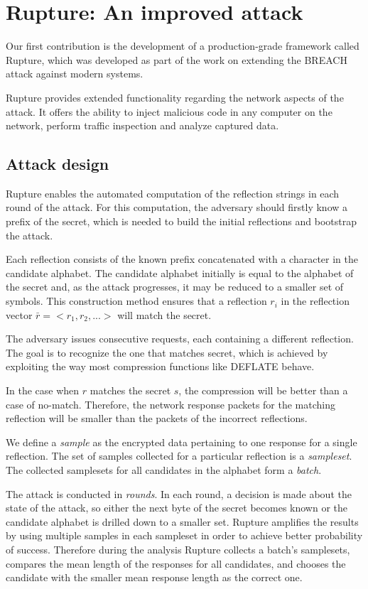 \section{Rupture: An improved attack}\label{subsec:rupture}
Our first contribution is the development of a production-grade framework called
Rupture, which was developed as part of the work on extending the BREACH attack
against modern systems.

Rupture provides extended functionality regarding the network aspects of the
attack. It offers the ability to inject malicious code in any computer on the
network, perform traffic inspection and analyze captured data.

\subsection{Attack design}\label{subsec:rupture_attack_design}

Rupture enables the automated computation of the reflection strings in each
round of the attack. For this computation, the adversary should firstly know a
prefix of the secret, which is needed to build the initial reflections and
bootstrap the attack.

Each reflection consists of the known prefix concatenated with a character in
the candidate alphabet. The candidate alphabet initially is equal to the
alphabet of the secret and, as the attack progresses, it may be reduced to a
smaller set of symbols. This construction method ensures that a reflection $r_i$
in the reflection vector $\bar{r} = <r_1, r_2, ...>$ will match the secret.

The adversary issues consecutive requests, each containing a different
reflection. The goal is to recognize the one that matches secret, which is
achieved by exploiting the way most compression functions like DEFLATE behave.

In the case when $r$ matches the secret $s$, the compression will be better than
a case of no-match. Therefore, the network response packets for the matching
reflection will be smaller than the packets of the incorrect reflections.

We define a \textit{sample} as the encrypted data pertaining to one response for
a single reflection. The set of samples collected for a particular reflection is a
\textit{sampleset}. The collected samplesets for all candidates in the alphabet
form a \textit{batch}.

The attack is conducted in \textit{rounds}. In each round, a decision is made
about the state of the attack, so either the next byte of the secret becomes
known or the candidate alphabet is drilled down to a smaller set. Rupture
amplifies the results by using multiple samples in each
sampleset in order to achieve better probability of success. Therefore during the
analysis Rupture collects a batch's samplesets, compares the mean length of the
responses for all candidates, and chooses the candidate with the smaller mean
response length as the correct one.

